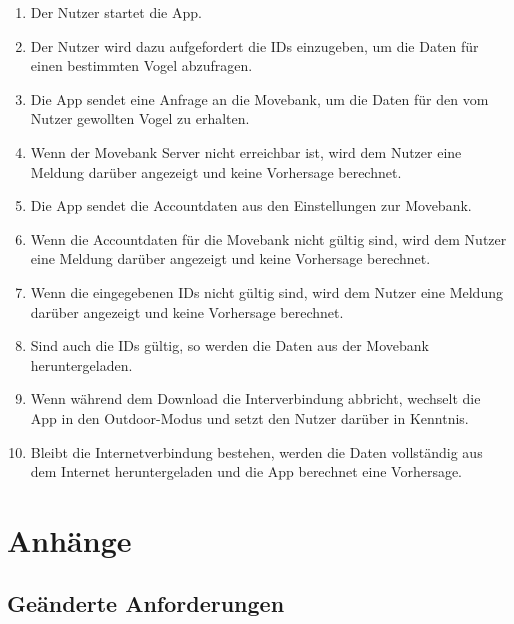 \documentclass[12pt]{article} %
\begin{document}
\begin{enumerate}[label={\arabic*.}]
\item Der Nutzer startet die App.
\item Der Nutzer wird dazu aufgefordert die IDs einzugeben, um die Daten für einen bestimmten Vogel abzufragen.
\item Die App sendet eine Anfrage an die Movebank, um die Daten für den vom Nutzer gewollten Vogel zu erhalten.
\item Wenn der Movebank Server nicht erreichbar ist, wird dem Nutzer eine Meldung darüber angezeigt und keine Vorhersage berechnet.
\item Die App sendet die Accountdaten aus den Einstellungen zur Movebank.
\item Wenn die Accountdaten für die Movebank nicht gültig sind, wird dem Nutzer eine Meldung darüber angezeigt und keine Vorhersage berechnet.
\item Wenn die eingegebenen IDs nicht gültig sind, wird dem Nutzer eine Meldung darüber angezeigt und keine Vorhersage berechnet.
\item Sind auch die IDs gültig, so werden die Daten aus der Movebank heruntergeladen.
\item Wenn während dem Download die Interverbindung abbricht, wechselt die App in den Outdoor-Modus und setzt den Nutzer darüber in Kenntnis.
\item Bleibt die Internetverbindung bestehen, werden die Daten vollständig aus dem Internet heruntergeladen und die App berechnet eine Vorhersage.
\end{enumerate}




\section{Anhänge}

\subsection{Geänderte Anforderungen}


\end{document}

